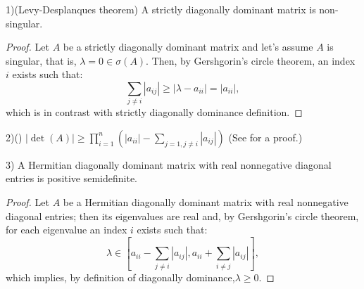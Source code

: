 \documentclass[12pt]{article}
\begin{document}
1)(Levy-Desplanques theorem) A strictly diagonally dominant matrix is non-singular.

\begin{proof}
Let $A$ be a strictly diagonally dominant matrix and let's assume $A$ is singular, that is, $\lambda=0\in\sigma(A)$. Then, by Gershgorin's circle theorem, an index $i$ exists such that:
\[
\sum_{j\ne i}\left|a_{ij}\right|\geq\left|\lambda-a_{ii}\right|=\left|a_{ii}\right|,
\]
which is in contrast with strictly diagonally dominance definition.
\end{proof}

2)() $\left\vert\det(A)\right\vert\geq\prod_{i=1}^{n}\left(\left\vert a_{ii}\right\vert -\sum_{j=1,j\neq i}\left\vert
a_{ij}\right\vert\right)$ (See  for a proof.)

3) A Hermitian diagonally dominant matrix with real nonnegative diagonal entries is positive semidefinite.

\begin{proof}
Let $A$ be a Hermitian diagonally dominant matrix with real nonnegative diagonal entries; then its eigenvalues are real and, by Gershgorin's circle theorem, for each eigenvalue an index $i$ exists such that:
\[
\lambda\in[a_{ii}-\sum_{j\ne i}\left|a_{ij}\right|, a_{ii}+\sum_{i\ne j}\left|a_{ij}\right| ],
\]
which implies, by definition of diagonally dominance,$\lambda\geq 0.$
\end{proof}
\end{document}
